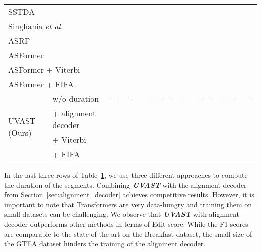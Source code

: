 \begin{table}[t]
{\begin{tabular}{ll|ccc|c|c||ccc|c|c||ccc|c|c}
\multicolumn{2}{l|}{SSTDA \cite{chen2020action}} &  &  &  &  &  &  &  &  &  &  &  &  &  &  & \\
\multicolumn{2}{l|}{Singhania \textit{et al.} \cite{singhania2021coarse}} &  &  &  &  & \uline{} &  &  &  &  &  &  &  &  &  & \\
\multicolumn{2}{l|}{ASRF \cite{asrf}} &  &  &  &  &  &  &  &  &  &  &  &  & \uline{} &  & \\
\multicolumn{2}{l|}{ASFormer \cite{asformer}} &  &  &  &  & \uline{} &  &  &  & \uline{} & \uline{} &  &    &  &  & \\
\multicolumn{2}{l|}{ASFormer \cite{asformer} + Viterbi} &  &  &  &  &  &  &  &  &  &  & \underline{} & \underline{} &  &  &  \\
\multicolumn{2}{l|}{ASFormer \cite{asformer} + FIFA} & \underline{} & \underline{} &  &  &  &  &  &  &  &  &  &  &  &  &  \\ 
\hline 
\multirow{4}{*}{UVAST (Ours)} & w/o duration & - & - & - &  & - & - & - & - &  & - & - & - & - &  & - \\
  & + alignment decoder &  &  &  &  &  &  &  &  &  &  &  &  &  & \uline{} &  \\
  & + Viterbi &  &  &  &  &  &  &  &  &  &  &  &  &  &  & \uline{} \\
  & + FIFA &  &  & \underline{} & \uline{} &  & \uline{} & \uline{} & \uline{} &  &  &  &  &  & \uline{} &  \\
\hline 
\hline
\end{tabular}
}
\label{tab:fully_supervised}
\end{table}
In the last three rows of Table~\ref{tab:fully_supervised}, we use three different approaches to compute the duration of the segments.
Combining \textit{\textbf{UVAST}} with the alignment decoder from Section~\ref{sec:alignment_decoder} achieves competitive results. However, it is important to note that Transformers are very data-hungry and training them on small datasets can be challenging.
We observe that \textit{\textbf{UVAST}} with alignment decoder outperforms other methods in terms of Edit score. While the F1 scores are comparable to the state-of-the-art on the Breakfast dataset, the small size of the GTEA dataset hinders the training of the alignment decoder. 

